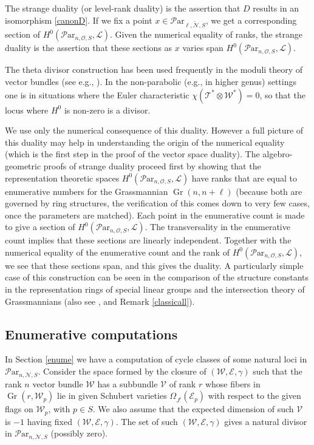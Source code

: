 \documentclass[11pt]{amsart}
\newcommand\me{\mathcal{E}}
\newcommand\mt{\mathcal{T}}
\newcommand\mv{\mathcal{V}}
\newcommand\tensor{\otimes}
\newcommand\ml{\mathcal{L}}
\newcommand\mw{\mathcal{W}}
\newcommand\Par{\mathcal{P}\text{ar} }
\newcommand\Gr{\operatorname{Gr}}
\numberwithin{theorem}{subsection}
\begin{document}
{The strange duality (or level-rank duality) is the assertion that $D$ results in an isomorphism
\eqref{canonD}. If we fix a point $x\in\Par_{\ell,\widetilde{\mathcal{N}},S}$, we get a corresponding section of $H^0(\Par_{n,\mathcal{O},S},\ml)$. Given the numerical equality of ranks, the strange duality is the assertion that  these sections as $x$ varies span $H^0(\Par_{n,\mathcal{O},S},\ml)$.


The theta divisor construction has been used frequently in the moduli theory of vector bundles (see e.g., \cite{Faltings}). In the non-parabolic (e.g., in higher genus) settings one is in situations where the Euler characteristic $\chi(\mt^*\tensor \mw^*)=0$, so that the locus where $H^0$ is non-zero is a divisor.

We  use only the numerical consequence of this duality. However a full picture of this duality may help in understanding the origin of the numerical equality (which is the first step in the proof of the vector space duality). The algebro-geometric proofs of strange duality proceed first by showing that the representation
theoretic spaces $H^0(\Par_{n,\mathcal{O},S},\ml)$ have ranks that are equal to enumerative numbers for the Grassmannian $\Gr(n,n+\ell)$ (because both are governed by ring structures,  the verification of this
comes down to very few cases, once the parameters are matched). Each point in the enumerative count is made to  give a section of $H^0(\Par_{n,\mathcal{O},S},\ml)$. The transversality in the enumerative count implies that these sections are linearly independent. Together with the numerical equality of the enumerative count and the rank of  $H^0(\Par_{n,\mathcal{O},S},\ml)$, we see that these sections span, and this gives the duality. A particularly simple case of this construction can be seen in the comparison of the structure constants in the representation rings of special linear groups and the intersection theory of Grassmannians \cite{BIMRN} (also see \cite[Section 6.2]{FBull}, and Remark \ref{classicall}).


\subsection{Enumerative computations}\label{concept}
In Section \ref{enume} we have a computation of cycle classes of some natural loci in $\Par_{n,\mathcal{N},S}$.  Consider  the space formed by  the closure of $(\mw,\me,\gamma)$ such that the rank $n$ vector bundle $\mw$ has a subbundle $\mv$ of rank $r$ whose fibers in $\Gr(r,\mw_p)$ lie in given Schubert varieties $\Omega_{J^i}(\me_p)$ with respect to the given flags on $\mw_p$, with $p\in S$. We also assume that the expected dimension of such $\mv$ is $-1$ having fixed $(\mw,\me,\gamma)$. The set of  such $(\mw,\me,\gamma)$ gives  a natural divisor in $\Par_{n,\mathcal{N},S}$ (possibly zero).

}
\end{document}
